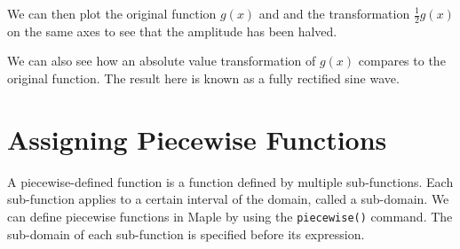 \begin{maplegroup}
\begin{mapleinput}
\end{mapleinput}
\mapleresult
{}
\end{maplegroup}


We can then plot the original function $g(x)$ and and the transformation $\frac{1}{2}g(x)$ on the same axes to see that the amplitude has been halved.

\begin{maplegroup}
\begin{mapleinput}
\end{mapleinput}
\mapleresult
{}
\end{maplegroup}

We can also see how an absolute value transformation of $g(x)$ compares to the original function. The result here is known as a fully rectified sine wave.

\begin{maplegroup}
\begin{mapleinput}
\end{mapleinput}
\mapleresult
{}
\end{maplegroup}


\section{Assigning Piecewise Functions}
\label{sec:piecewise}

A piecewise-defined function is a function defined by multiple sub-functions. Each sub-function applies to a certain interval of the domain, called a sub-domain. We can define piecewise functions in Maple by using the \texttt{piecewise()} command. The sub-domain of each sub-function is specified before its expression.


